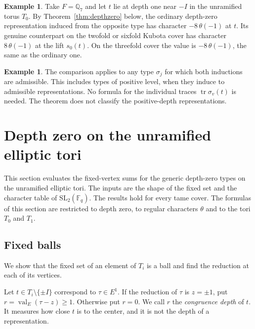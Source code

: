 \documentclass[12pt,letterpaper]{article}
\numberwithin{equation}{section}
\theoremstyle{definition}
\newtheorem{example}[theorem]{Example}
\theoremstyle{remark}
\newcommand{\kk}{\mathbb F_q}
\newcommand{\tr}{\operatorname{tr}}
\newcommand{\val}{\operatorname{val}}
\begin{document}
\begin{example}\label{ex:intro-values}
Take $F=\mathbb Q_7$ and let $t$ lie at depth one near $-I$ in the unramified torus $T_0$. By Theorem~\ref{thm:depthzero} below, the ordinary depth-zero representation induced from the opposite type has character $-8\,\theta(-1)$ at $t$. Its genuine counterpart on the twofold or sixfold Kubota cover has character $8\,\theta(-1)$ at the lift $s_0(t)$. On the threefold cover the value is $-8\,\theta(-1)$, the same as the ordinary one.
\end{example}

\begin{example}
The comparison applies to any type $\sigma_j$ for which both inductions are admissible. This includes types of positive level, when they induce to admissible representations. No formula for the individual traces $\tr\sigma_v(t)$ is needed. The theorem does not classify the positive-depth representations.
\end{example}

\section{Depth zero on the unramified elliptic tori}\label{sec:depthzero}
This section evaluates the fixed-vertex sums for the generic depth-zero types on the unramified elliptic tori. The inputs are the shape of the fixed set and the character table of $\mathrm{SL}_2(\kk)$. The results hold for every tame cover. The formulas of this section are restricted to depth zero, to regular characters $\theta$ and to the tori $T_0$ and $T_1$.

\subsection*{Fixed balls}
We show that the fixed set of an element of $T_i$ is a ball and find the reduction at each of its vertices.

Let $t\in T_i\setminus\{\pm I\}$ correspond to $\tau\in E^1$. If the reduction of $\tau$ is $z=\pm1$, put $r=\val_E(\tau-z)\ge1$. Otherwise put $r=0$. We call $r$ the \emph{congruence depth} of $t$. It measures how close $t$ is to the center, and it is not the depth of a representation.
\end{document}
